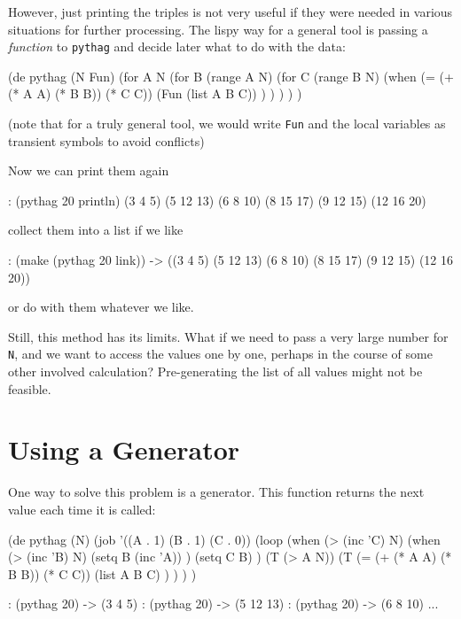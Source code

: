 However, just printing the triples is not very useful if they were needed in
various situations for further processing. The lispy way for a general tool is
passing a \textit{function} to \texttt{pythag} and decide later what to do with the data:
\begin{wideverbatim}
   (de pythag (N Fun)
      (for A N
         (for B (range A N)
            (for C (range B N)
               (when (= (+ (* A A) (* B B)) (* C C))
                  (Fun (list A B C)) ) ) ) ) )
\end{wideverbatim}

(note that for a truly general tool, we would write \texttt{Fun} and the local
variables as transient symbols to avoid conflicts)

Now we can print them again
\begin{wideverbatim}
   : (pythag 20 println)
   (3 4 5)
   (5 12 13)
   (6 8 10)
   (8 15 17)
   (9 12 15)
   (12 16 20)
\end{wideverbatim}

collect them into a list if we like
\begin{wideverbatim}
   : (make (pythag 20 link))
   -> ((3 4 5) (5 12 13) (6 8 10) (8 15 17) (9 12 15) (12 16 20))
\end{wideverbatim}

or do with them whatever we like.

Still, this method has its limits. What if we need to pass a very large number
for \texttt{N}, and we want to access the values one by one, perhaps in the course of
some other involved calculation? Pre-generating the list of all values might not
be feasible.

\section{Using a Generator}
\label{sec:coroutines-using-a-generator}

One way to solve this problem is a generator. This function returns the next
value each time it is called:
\begin{wideverbatim}
   (de pythag (N)
      (job '((A . 1) (B . 1) (C . 0))
         (loop
            (when (> (inc 'C) N)
               (when (> (inc 'B) N)
                  (setq B (inc 'A)) )
               (setq C B) )
            (T (> A N))
            (T (= (+ (* A A) (* B B)) (* C C))
               (list A B C) ) ) ) )

   : (pythag 20)
   -> (3 4 5)
   : (pythag 20)
   -> (5 12 13)
   : (pythag 20)
   -> (6 8 10)
   ...
\end{wideverbatim}

